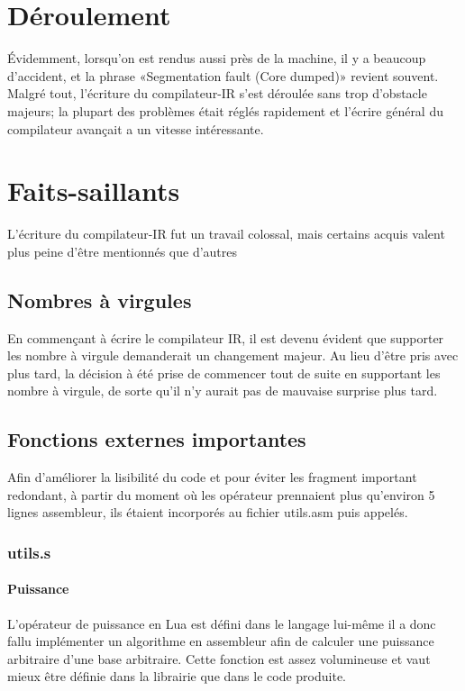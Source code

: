 \documentclass{article}
\begin{document}
\section{Déroulement}
Évidemment, lorsqu'on est rendus aussi près de la machine, il y a beaucoup d'accident, et la phrase «Segmentation fault (Core dumped)» revient souvent. Malgré tout, l'écriture du compilateur-IR s'est déroulée sans trop d'obstacle majeurs; la plupart des problèmes était réglés rapidement et l'écrire général du compilateur avançait a un vitesse intéressante.

\section{Faits-saillants}
L'écriture du compilateur-IR fut un travail colossal, mais certains acquis valent plus peine d'être mentionnés que d'autres

\subsection{Nombres à virgules}
En commençant à écrire le compilateur IR, il est devenu évident que supporter les nombre à virgule demanderait un changement majeur. Au lieu d'être pris avec plus tard, la décision à été prise de commencer tout de suite en supportant les nombre à virgule, de sorte qu'il n'y aurait pas de mauvaise surprise plus tard.

\subsection{Fonctions externes importantes}
Afin d'améliorer la lisibilité du code et pour éviter les fragment important redondant, à partir du moment où les opérateur prennaient plus qu'environ 5 lignes assembleur, ils étaient incorporés au fichier utils.asm puis appelés.

\subsubsection{utils.s}
\paragraph{Puissance}
L'opérateur de puissance en Lua est défini dans le langage lui-même il a donc fallu implémenter un algorithme en assembleur afin de calculer une puissance arbitraire d'une base arbitraire. Cette fonction est assez volumineuse et vaut mieux être définie dans la librairie que dans le code produite.
\end{document}
